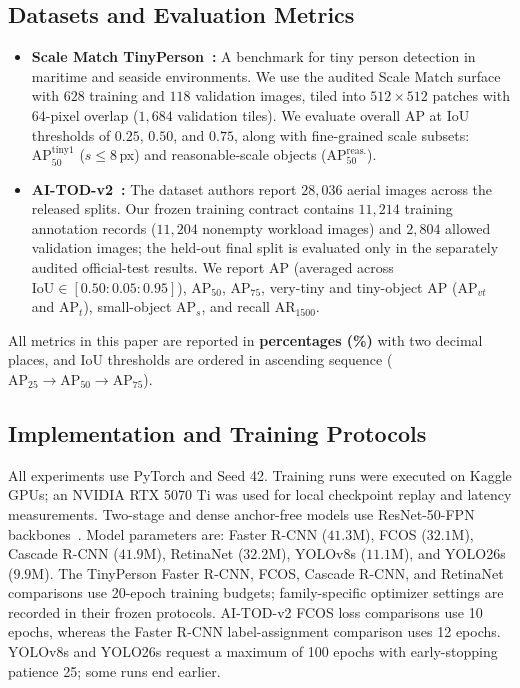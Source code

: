 \documentclass[11pt,a4paper]{article}
\begin{document}
\subsection{Datasets and Evaluation Metrics}
\begin{itemize}
  \item \textbf{Scale Match TinyPerson~\cite{yu2020tinyperson}:} A benchmark for tiny person detection in maritime and seaside environments. We use the audited Scale Match surface with $628$ training and $118$ validation images, tiled into $512\times512$ patches with $64$-pixel overlap ($1,684$ validation tiles). We evaluate overall AP at IoU thresholds of $0.25$, $0.50$, and $0.75$, along with fine-grained scale subsets: $\mathrm{AP}_{50}^{\mathrm{tiny1}}$ ($s \le 8$\,px) and reasonable-scale objects ($\mathrm{AP}_{50}^{\mathrm{reas.}}$).
  \item \textbf{AI-TOD-v2~\cite{xu2022aitodv2nwd}:} The dataset authors report $28,036$ aerial images across the released splits. Our frozen training contract contains $11,214$ training annotation records ($11,204$ nonempty workload images) and $2,804$ allowed validation images; the held-out final split is evaluated only in the separately audited official-test results. We report $\mathrm{AP}$ (averaged across $\text{IoU} \in [0.50:0.05:0.95]$), $\mathrm{AP}_{50}$, $\mathrm{AP}_{75}$, very-tiny and tiny-object AP ($\mathrm{AP}_{vt}$ and $\mathrm{AP}_{t}$), small-object $\mathrm{AP}_s$, and recall $\mathrm{AR}_{1500}$.
\end{itemize}
All metrics in this paper are reported in \textbf{percentages (\%)} with two decimal places, and IoU thresholds are ordered in ascending sequence ($\mathrm{AP}_{25} \to \mathrm{AP}_{50} \to \mathrm{AP}_{75}$).

\subsection{Implementation and Training Protocols}
All experiments use PyTorch and Seed 42. Training runs were executed on Kaggle GPUs; an NVIDIA RTX 5070 Ti was used for local checkpoint replay and latency measurements. Two-stage and dense anchor-free models use ResNet-50-FPN backbones~\cite{he2016resnet,lin2017fpn}. Model parameters are: Faster R-CNN ($41.3$M), FCOS ($32.1$M), Cascade R-CNN ($41.9$M), RetinaNet ($32.2$M), YOLOv8s ($11.1$M), and YOLO26s ($9.9$M). The TinyPerson Faster R-CNN, FCOS, Cascade R-CNN, and RetinaNet comparisons use 20-epoch training budgets; family-specific optimizer settings are recorded in their frozen protocols. AI-TOD-v2 FCOS loss comparisons use 10 epochs, whereas the Faster R-CNN label-assignment comparison uses 12 epochs. YOLOv8s and YOLO26s request a maximum of 100 epochs with early-stopping patience 25; some runs end earlier.
\end{document}
